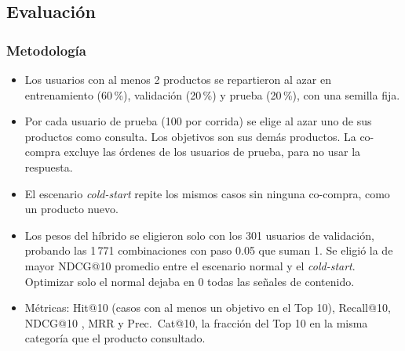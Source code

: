\subsection{Evaluación}\label{sec:rec-eval}
\subsubsection{Metodología}
\begin{itemize}
  \item Los usuarios con al menos 2 productos se repartieron al azar en entrenamiento (60\,\%), validación (20\,\%) y prueba (20\,\%), con una semilla fija.
  \item Por cada usuario de prueba (100 por corrida) se elige al azar uno de sus productos como consulta. Los objetivos son sus demás productos. La co-compra excluye las órdenes de los usuarios de prueba, para no usar la respuesta.
  \item El escenario \emph{cold-start} repite los mismos casos sin ninguna co-compra, como un producto nuevo.
  \item Los pesos del híbrido se eligieron solo con los 301 usuarios de validación, probando las 1\,771 combinaciones con paso 0.05 que suman 1. Se eligió la de mayor NDCG@10 promedio entre el escenario normal y el \emph{cold-start}. Optimizar solo el normal dejaba en 0 todas las señales de contenido.
  \item Métricas: Hit@10 (casos con al menos un objetivo en el Top 10), Recall@10, NDCG@10 \citep{ndcg}, MRR y Prec.~Cat@10, la fracción del Top 10 en la misma categoría que el producto consultado.
\end{itemize}

